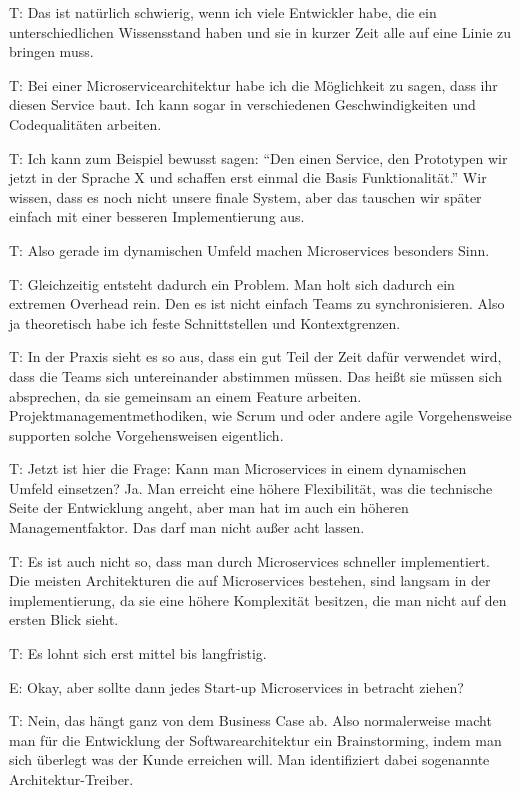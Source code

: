 T: Das ist natürlich schwierig, wenn ich viele Entwickler habe, die ein unterschiedlichen Wissensstand haben und sie in kurzer Zeit alle auf eine Linie zu bringen muss.

\label{appendix:t-7}
T: Bei einer Microservicearchitektur habe ich die Möglichkeit zu sagen, dass ihr diesen Service baut. Ich kann sogar in verschiedenen Geschwindigkeiten und Codequalitäten arbeiten.

T: Ich kann zum Beispiel bewusst sagen: “Den einen Service, den Prototypen wir jetzt in der Sprache X und schaffen erst einmal die Basis Funktionalität.” Wir wissen, dass es noch nicht unsere finale System, aber das tauschen wir später einfach mit einer besseren Implementierung aus.

\label{appendix:t-8}
T: Also gerade im dynamischen Umfeld machen Microservices besonders Sinn.

\label{appendix:t-9}
T: Gleichzeitig entsteht dadurch ein Problem. Man holt sich dadurch ein extremen Overhead rein. Den es ist nicht einfach Teams zu synchronisieren. Also ja theoretisch habe ich feste Schnittstellen und Kontextgrenzen.

\label{appendix:t-10}
T: In der Praxis sieht es so aus, dass ein gut Teil der Zeit dafür verwendet wird, dass die Teams sich untereinander abstimmen müssen. Das heißt sie müssen sich absprechen, da sie gemeinsam an einem Feature arbeiten. Projektmanagementmethodiken, wie Scrum und oder andere agile Vorgehensweise supporten solche Vorgehensweisen eigentlich.

\label{appendix:t-11} \label{appendix:t-12}
T: Jetzt ist hier die Frage: Kann man Microservices in einem dynamischen Umfeld einsetzen?  Ja. Man erreicht eine höhere Flexibilität, was die technische Seite der Entwicklung angeht, aber man hat im auch ein höheren Managementfaktor. Das darf man nicht außer acht lassen.

T: Es ist auch nicht so, dass man durch Microservices schneller implementiert. Die meisten Architekturen die auf Microservices bestehen, sind langsam in der implementierung, da sie eine höhere Komplexität besitzen, die man nicht auf den ersten Blick sieht.

\label{appendix:t-13}
T: Es lohnt sich erst mittel bis langfristig.

E: Okay, aber sollte dann jedes Start-up Microservices in betracht ziehen?

\label{appendix:t-14}
T: Nein, das hängt ganz von dem Business Case ab. Also normalerweise macht man für die Entwicklung der Softwarearchitektur ein Brainstorming, indem man sich überlegt was der Kunde erreichen will. Man identifiziert dabei sogenannte Architektur-Treiber.

